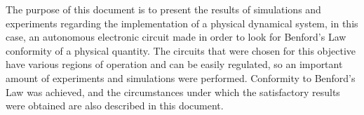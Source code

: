 The purpose of this document is to present the results of simulations and experiments regarding the implementation of a physical dynamical system, in this case, an autonomous electronic circuit made in order to look for Benford's Law conformity of a physical quantity. 
The circuits that were chosen for this objective have various regions of operation and can be easily regulated, so an important amount of experiments and simulations were performed.
Conformity to Benford's Law was achieved, and the circumstances under which the satisfactory results were obtained are also described in this document. 